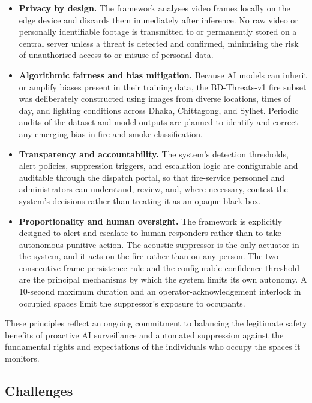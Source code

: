 \begin{itemize}
\item \textbf{Privacy by design.} The framework analyses video frames locally on the edge device and discards them immediately after inference. No raw video or personally identifiable footage is transmitted to or permanently stored on a central server unless a threat is detected and confirmed, minimising the risk of unauthorised access to or misuse of personal data.

\item \textbf{Algorithmic fairness and bias mitigation.} Because AI models can inherit or amplify biases present in their training data, the BD-Threats-v1 fire subset was deliberately constructed using images from diverse locations, times of day, and lighting conditions across Dhaka, Chittagong, and Sylhet. Periodic audits of the dataset and model outputs are planned to identify and correct any emerging bias in fire and smoke classification.

\item \textbf{Transparency and accountability.} The system's detection thresholds, alert policies, suppression triggers, and escalation logic are configurable and auditable through the dispatch portal, so that fire-service personnel and administrators can understand, review, and, where necessary, contest the system's decisions rather than treating it as an opaque black box.

\item \textbf{Proportionality and human oversight.} The framework is explicitly designed to alert and escalate to human responders rather than to take autonomous punitive action. The acoustic suppressor is the only actuator in the system, and it acts on the fire rather than on any person. The two-consecutive-frame persistence rule and the configurable confidence threshold are the principal mechanisms by which the system limits its own autonomy. A 10-second maximum duration and an operator-acknowledgement interlock in occupied spaces limit the suppressor's exposure to occupants.
\end{itemize}

These principles reflect an ongoing commitment to balancing the legitimate safety benefits of proactive AI surveillance and automated suppression against the fundamental rights and expectations of the individuals who occupy the spaces it monitors.

\subsection{Challenges}

